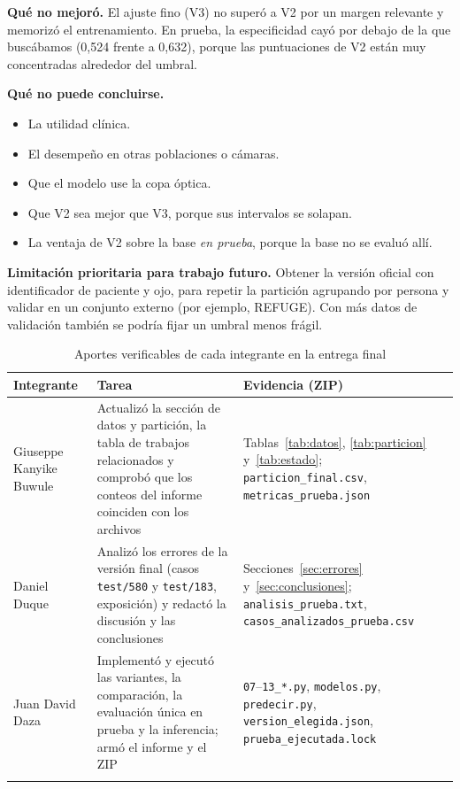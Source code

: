 \documentclass[pdflatex,sn-mathphys-num]{sn-jnl}%
\theoremstyle{thmstyleone}%
\theoremstyle{thmstyletwo}%
\theoremstyle{thmstylethree}%
\begin{document}
\textbf{Qué no mejoró.} El ajuste fino (V3) no superó a V2 por un margen relevante y memorizó el entrenamiento. En prueba, la especificidad cayó por debajo de la que buscábamos (0,524 frente a 0,632), porque las puntuaciones de V2 están muy concentradas alrededor del umbral.

\textbf{Qué no puede concluirse.}
\begin{itemize}
\item La utilidad clínica.
\item El desempeño en otras poblaciones o cámaras.
\item Que el modelo use la copa óptica.
\item Que V2 sea mejor que V3, porque sus intervalos se solapan.
\item La ventaja de V2 sobre la base \emph{en prueba}, porque la base no se evaluó allí.
\end{itemize}

\textbf{Limitación prioritaria para trabajo futuro.} Obtener la versión oficial con identificador de paciente y ojo, para repetir la partición agrupando por persona y validar en un conjunto externo (por ejemplo, REFUGE). Con más datos de validación también se podría fijar un umbral menos frágil.

\begin{table}[htbp]
\small
\caption{Aportes verificables de cada integrante en la entrega final}\label{tab:roles}
\begin{tabularx}{\textwidth}{@{}L{2.7cm}YY@{}}
\toprule
Integrante & Tarea & Evidencia (ZIP) \\
\midrule
Giuseppe Kanyike Buwule & Actualizó la sección de datos y partición, la tabla de trabajos relacionados y comprobó que los conteos del informe coinciden con los archivos & Tablas~\ref{tab:datos}, \ref{tab:particion} y~\ref{tab:estado}; \texttt{particion\_final.csv}, \texttt{metricas\_prueba.json} \\
Daniel Duque & Analizó los errores de la versión final (casos \texttt{test/580} y \texttt{test/183}, exposición) y redactó la discusión y las conclusiones & Secciones~\ref{sec:errores} y~\ref{sec:conclusiones}; \texttt{analisis\_prueba.txt}, \texttt{casos\_analizados\_prueba.csv} \\
Juan David Daza & Implementó y ejecutó las variantes, la comparación, la evaluación única en prueba y la inferencia; armó el informe y el ZIP & \texttt{07}--\texttt{13\_*.py}, \texttt{modelos.py}, \texttt{predecir.py}, \texttt{version\_elegida.json}, \texttt{prueba\_ejecutada.lock} \\
\botrule
\end{tabularx}
\end{table}
\end{document}
